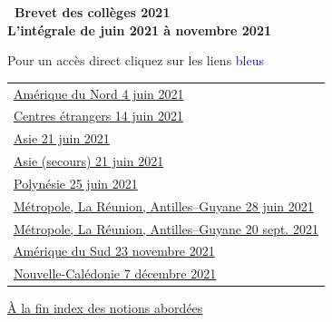 \documentclass[11pt]{article}
\begin{document}
\setlength\parindent{0mm}

\pagestyle{fancy}
\thispagestyle{empty}
\begin{center} {\huge \textbf{\decofourleft~Brevet des collèges  2021~\decofourright\\\vspace{1cm} L'intégrale de juin 2021 à novembre 2021}}

\vspace{1cm}

Pour un accès direct cliquez sur les liens {\Large \textcolor{blue}{bleus}}
\end{center}
 
\begin{tabularx}{\linewidth}{>{\Large}X}

\hyperlink{AmeriqueduNord}{Amérique du Nord 4 juin 2021}\dotfill \pageref{AmeriqueduNord} \\
\hyperlink{Etranger}{Centres étrangers  14 juin 2021} \dotfill \pageref{Etranger} \\
\hyperlink{Asie}{Asie 21 juin  2021} \dotfill \pageref{Asie}  \\
\hyperlink{Asie_secours}{Asie (secours) 21 juin  2021} \dotfill \pageref{Asie_secours}  \\
\hyperlink{Polynesie}{Polynésie 25 juin 2021} \dotfill \pageref{Polynesie} \\
\hyperlink{Metropole}{Métropole, La Réunion, Antilles--Guyane 28 juin 2021} \dotfill \pageref{Metropole}\\
\hyperlink{Metropolesep}{Métropole, La Réunion, Antilles--Guyane 20 sept. 2021} \dotfill \pageref{Metropolesep} \\
\hyperlink{AmeriqueSud}{Amérique du Sud 23 novembre 2021}  \dotfill \pageref{AmeriqueSud} \\
\hyperlink{Caledoniedec}{Nouvelle-Calédonie 7 décembre 2021}  \dotfill \pageref{Caledoniedec}
\end{tabularx}

\vspace{1cm}

\hyperlink{Index}{À la fin index des notions abordées}
\newpage
 ~
\newpage
\hypertarget{AmeriqueduNord}{}

\label{AmeriqueduNord}

\end{document}
